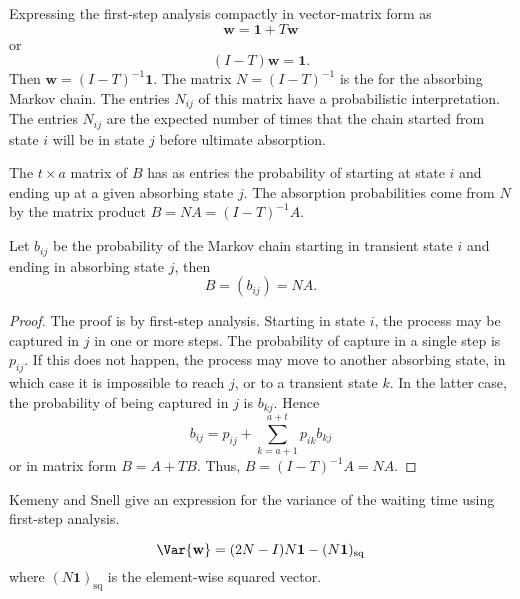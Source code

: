 \documentclass[12pt]{article}
\begin{document}
Expressing the first-step analysis compactly in vector-matrix form as
\[
    \mathbf{w} = \mathbf{1} + T \mathbf{w}
\] or
\[
    (I - T) \mathbf{w} = \mathbf{1}.
\] Then \( \mathbf{w} = (I-T)^{-1} \mathbf{1} \).  The matrix \( N = (I-T)^
{-1} \) is the %
for the absorbing Markov chain.  The entries \( N_{ij} \) of this matrix
have a probabilistic interpretation.  The entries \( N_{ij} \) are the
expected number of times that the chain started from state \( i \) will
be in state \( j \) before ultimate absorption.

The \( t \times a \) matrix of %
\( B \) has as entries the probability of starting at state \( i \) and
ending up at a given absorbing state \( j \).  The absorption
probabilities come from \( N \) by the matrix product \( B = NA = (I-T)^
{-1}A \).

\begin{theorem}
    Let \( b_{ij} \) be the probability of the Markov chain starting in
    transient state \( i \) and ending in absorbing state \( j \), then
    \[
        B = ( b_{ij} ) = NA.
    \]
\end{theorem}

\begin{proof}
    The proof is by first-step analysis.  Starting in state \( i \), the
    process may be captured in \( j \) in one or more steps.  The
    probability of capture in a single step is \( p_{ij} \).  If this
    does not happen, the process may move to another absorbing state, in
    which case it is impossible to reach \( j \), or to a transient
    state \( k \).  In the latter case, the probability of being
    captured in \( j \) is \( b_{kj} \).  Hence
    \[
        b_{ij} = p_{ij} + \sum\limits_{k =a+1}^{a+t} p_{ik} b_{kj}
    \] or in matrix form \( B = A + TB \).  Thus, \( B = (I-T)^{-1} A =
    NA \).
\end{proof}

Kemeny and Snell
\cite[page 51]{kemeny60} give an expression for the variance
of the waiting time using first-step analysis.

\begin{theorem}
    \label{thm:waitingtimeabsorbtion:varwaittime}
    \[
        \Var{\mathbf{w}} = (2N - I)N\mathbf{1} - (N\mathbf{1})_{\text{sq}}
    \] where \( (N\mathbf{1})_{\text{sq}} \) is the element-wise squared
    vector.
\end{theorem}
\end{document}
